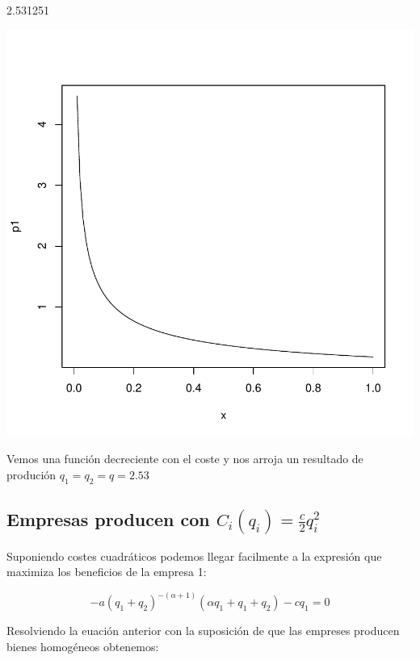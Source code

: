 \documentclass{article}
\begin{document}
\begin{Schunk}
\begin{Soutput}
[1] 2.531251
\end{Soutput}
\end{Schunk}
\includegraphics{PUTAPRUEBA-001}

Vemos una función decreciente con el coste y nos arroja un resultado de produción $q_1=q_2=q=2.53$

\subsection{Empresas producen con $C_i(q_i)=\frac{c}{2}q_i^2$}

Suponiendo costes cuadr\'aticos podemos llegar facilmente a la expresión que maximiza los beneficios de la empresa 1:

  $$-a(q_1+q_2)^{-(\alpha+1)}(\alpha q_1+q_1+q_2)-cq_1=0$$

Resolviendo la euación anterior con la suposici\'on de que las empreses producen bienes homog\'eneos obtenemos:
  
\end{document}
